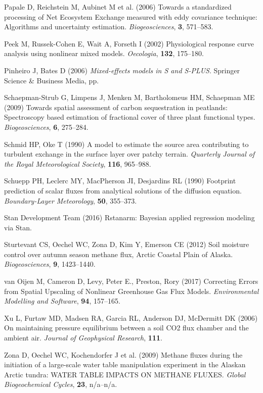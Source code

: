 \hypertarget{ref-Papale2006}{}
Papale D, Reichstein M, Aubinet M et al. (2006) Towards a standardized
processing of Net Ecosystem Exchange measured with eddy covariance
technique: Algorithms and uncertainty estimation. \emph{Biogeosciences},
\textbf{3}, 571--583.

\hypertarget{ref-Peek2002}{}
Peek M, Russek-Cohen E, Wait A, Forseth I (2002) Physiological response
curve analysis using nonlinear mixed models. \emph{Oecologia},
\textbf{132}, 175--180.

\hypertarget{ref-Pinheiro2006}{}
Pinheiro J, Bates D (2006) \emph{\textup{Mixed-effects models in S and
S-PLUS}}. Springer Science \& Business Media, pp.

\hypertarget{ref-Schaepman-Strub2009}{}
Schaepman-Strub G, Limpens J, Menken M, Bartholomeus HM, Schaepman ME
(2009) Towards spatial assessment of carbon sequestration in peatlands:
Spectroscopy based estimation of fractional cover of three plant
functional types. \emph{Biogeosciences}, \textbf{6}, 275--284.

\hypertarget{ref-Schmid1990}{}
Schmid HP, Oke T (1990) A model to estimate the source area contributing
to turbulent exchange in the surface layer over patchy terrain.
\emph{Quarterly Journal of the Royal Meteorological Society},
\textbf{116}, 965--988.

\hypertarget{ref-Schuepp1990}{}
Schuepp PH, Leclerc MY, MacPherson JI, Desjardins RL (1990) Footprint
prediction of scalar fluxes from analytical solutions of the diffusion
equation. \emph{Boundary-Layer Meteorology}, \textbf{50}, 355--373.

\hypertarget{ref-StanDevelopmentTeam2016}{}
Stan Development Team (2016) Rstanarm: Bayesian applied regression
modeling via Stan.

\hypertarget{ref-Sturtevant2012}{}
Sturtevant CS, Oechel WC, Zona D, Kim Y, Emerson CE (2012) Soil moisture
control over autumn season methane flux, Arctic Coastal Plain of Alaska.
\emph{Biogeosciences}, \textbf{9}, 1423--1440.

\hypertarget{ref-vanOijen2017}{}
van Oijen M, Cameron D, Levy, Peter E., Preston, Rory (2017) Correcting
Errors from Spatial Upscaling of Nonlinear Greenhouse Gas Flux Models.
\emph{Environmental Modelling and Software}, \textbf{94}, 157--165.

\hypertarget{ref-Xu2006}{}
Xu L, Furtaw MD, Madsen RA, Garcia RL, Anderson DJ, McDermitt DK (2006)
On maintaining pressure equilibrium between a soil CO2 flux chamber and
the ambient air. \emph{Journal of Geophysical Research}, \textbf{111}.

\hypertarget{ref-Zona2009}{}
Zona D, Oechel WC, Kochendorfer J et al. (2009) Methane fluxes during
the initiation of a large-scale water table manipulation experiment in
the Alaskan Arctic tundra: WATER TABLE IMPACTS ON METHANE FLUXES.
\emph{Global Biogeochemical Cycles}, \textbf{23}, n/a--n/a.